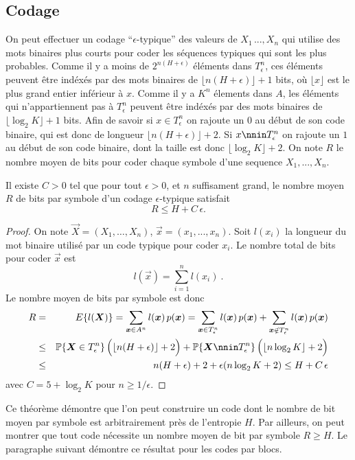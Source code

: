 \subsection{Codage} 
On peut effectuer un codage ``$\epsilon$-typique'' des
valeurs de $X_1\,...,X_n$ qui utilise des mots binaires plus courts
pour coder les s\'equences typiques qui sont les plus probables.
Comme il y a moins de $2^{n(H+\epsilon)}$ \'el\'ements
dans $T^n_\epsilon$, ces \'el\'ements peuvent \^etre ind\'ex\'es
par des mots binaires de $\lfloor n(H+\epsilon)\rfloor + 1$
bits, o\`u  $\lfloor x \rfloor$ est le plus grand entier inf\'erieur
\`a $x$.
Comme il y a $K^n$ \'elements dans $A$, les \'el\'ements
qui n'appartiennent pas \`a $T^n_\epsilon$ peuvent \^etre
ind\'ex\'es par des mots binaires de
$\lfloor \log_2 K \rfloor + 1$ bits. Afin de savoir si
$x \in T^n_\epsilon$ on rajoute
un $0$ au d\'ebut de son code binaire, qui est donc de longueur
$\lfloor n(H+\epsilon)\rfloor + 2$. Si $x \nnin T^n_\epsilon$
on rajoute un $1$ au d\'ebut de son code binaire, dont la
taille est donc $\lfloor \log_2 K \rfloor + 2$.
On note $R$ le nombre moyen de bits pour coder chaque
symbole d'une sequence $X_1, ... , X_n$.


\begin{theorem}
Il existe $C > 0$ tel que pour tout
$\epsilon > 0$, et $n$ suffisament grand,
le nombre moyen $R$ de bits par symbole d'un
codage $\epsilon$-typique satisfait
\[
R \leq H + C\, \epsilon .
\]
\end{theorem}
\begin{proof}
On note $\vec X = (X_1, \dots , X_n )$,
$\vec x = (x_1 , ... , x_n )$. Soit $l(x_i)$ la longueur du
mot binaire utilis\'e par un code typique pour coder $x_i$.
Le nombre total de bits pour coder $\vec x$ est
\[
l(\vec x) = \sum_{i=1}^n l(x_i)~.
\]
Le nombre moyen de bits par symbole est donc
\begin{eqnarray*}
R &=& E \{ l(\vec X)\} =
\sum_{\vec x \in A^n} l(\vec x)\, p(\vec x) =
\sum_{\vec x \in T^n_\epsilon} l(\vec x)\, p(\vec x) +
\sum_{\vec x \nin T^n_\epsilon} l(\vec x)\, p(\vec x) \\
&\leq& \PP \{\vec X \in T^n_\epsilon \}\,
\Bigl(\lfloor n(H+\epsilon)
\rfloor + 2\Bigr)
+ \PP \{\vec X \nnin T^n_\epsilon \}\,
\Bigl( \lfloor n \log_2 K \rfloor +
2\Bigr) \\
&\leq& n(H+\epsilon) + 2 + \epsilon ( n \log_2 K + 2) \leq
 H + C\, \epsilon
\end{eqnarray*}
avec $C = 5 + \log_2 K $ pour $n \geq 1/\epsilon$.
\end{proof}
Ce th\'eor\`eme d\'emontre que l'on peut construire un code
dont le nombre de bit moyen par symbole est arbitrairement
pr\`es de l'entropie $H$. Par ailleurs, on peut montrer
que tout code n\'ecessite un nombre moyen de bit par symbole $R \geq H$. Le paragraphe
suivant d\'emontre ce r\'esultat pour les codes par blocs.


